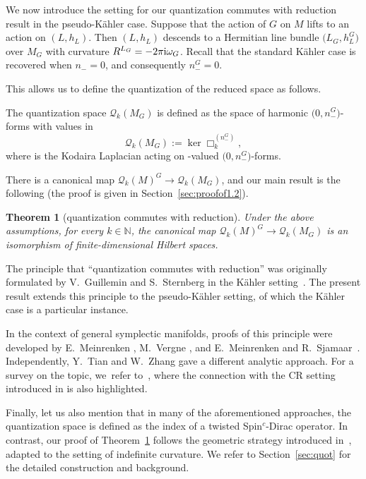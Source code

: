 \documentclass[10pt,a4paper]{amsart}
\numberwithin{equation}{section}
\newtheorem{Theorem}{Theorem}[section]
\begin{document}
We now introduce the setting for our quantization commutes with reduction result in the pseudo-K\"ahler case. Suppose that the action of $G$ on $M$ lifts to an action on $(L, h_L)$. Then $(L, h_L)$ descends to a Hermitian line bundle $\bigl(L_G, h_L^G\bigr)$ over $M_G$ with curvature $R^{L_G} = -2\pi {\rm i} \omega_G$.
	Recall that the standard K\"ahler case is recovered when $n_-=0$, and consequently $n_-^G=0$.
		
This allows us to define the quantization of the reduced space as follows.
		
\begin{Definition}
The quantization space $\mathcal{Q}_k(M_G)$ is defined as the space of harmonic $\bigl(0,n_-^G\bigr)$-forms with values in 
\[
\mathcal{Q}_k(M_G) := \ker \Box_k^{(n_-^G)},
\]
where  is the Kodaira Laplacian acting on -valued $\bigl(0,n_-^G\bigr)$-forms.
		\end{Definition}
		
There is a canonical map $\mathcal{Q}_k(M)^G \to \mathcal{Q}_k(M_G)$, and our main result is the following (the proof is given in Section~\ref{sec:proofof1.2}).
		
\begin{Theorem}[quantization commutes with reduction]\label{thm:qr=0}
Under the above assumptions, for every $k \in \mathbb{N}$, the canonical map
$\mathcal{Q}_k(M)^G \longrightarrow \mathcal{Q}_k(M_G)$ is an isomorphism of finite-dimensional Hilbert spaces.
\end{Theorem}
	
The principle that ``quantization commutes with reduction'' was originally formulated by V.~Guillemin and S.~Sternberg in the K\"ahler setting~\cite{gs}. The present result extends this principle to the pseudo-K\"ahler setting, of which the K\"ahler case is a particular instance.
		
In the context of general symplectic manifolds, proofs of this principle were developed by E.~Meinrenken \cite{14}, M.~Vergne \cite{v,v-II}, and E.~Meinrenken and R.~Sjamaar~\cite{16}. Independently, Y.~Tian and W.~Zhang \cite{tz} gave a different analytic approach. For a survey on the topic, we~refer to~\cite{ma}, where the connection with the CR setting introduced in \cite{hmm} is also highlighted.
		
Finally, let us also mention that in many of the aforementioned approaches, the quantization space is defined as the index of a twisted Spin$^c$-Dirac operator. In contrast, our proof of Theorem~\ref{thm:qr=0} follows the geometric strategy introduced in~\cite{gs}, adapted to the setting of indefinite curvature. We refer to Section~\ref{sec:quot} for the detailed construction and background.
\end{document}
